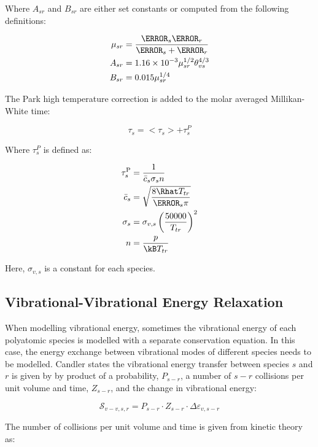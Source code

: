 \documentclass[10pt]{article}
\begin{document}
\begin{flushleft}
Where $A_{sr}$ and $B_{sr}$ are either set constants or computed from the following definitions:

\begin{align*}
    \mu_{sr} &= \frac{\MW_s \MW_r}{\MW_s + \MW_r}
    \\ A_{sr} &= 1.16 \times 10^{-3} \mu_{sr}^{1/2} \theta_{vs}^{4/3}
    \\ B_{sr} &= 0.015 \mu_{sr}^{1/4}
\end{align*}

The Park high temperature correction is added to the molar averaged Millikan-White time:

\begin{equation*}
    \tau_s = <\tau_s> + \tau_s^P
\end{equation*}

Where $\tau_s^P$ is defined as:

\begin{align*}
    \tau_{s}^\text{P} &= \frac{1}{\bar{c}_s \sigma_s n}
    \\ \bar{c}_s &= \sqrt{\frac{8 \Rhat T_{tr}}{ \MW_s \pi}}
    \\ \sigma_s &=  \sigma_{v,s} \bp{\frac{50000}{T_{tr}}}^2
    \\ n &= \frac{p}{\kB T_{tr}}
\end{align*}

Here, $\sigma_{v,s}$ is a constant for each species.

\subsection{Vibrational-Vibrational Energy Relaxation} 
\label{sec:vib-vib-relax}

When modelling vibrational energy, sometimes the vibrational energy of each polyatomic species is modelled with a separate conservation equation. In this case, the energy exchange between vibrational modes of different species needs to be modelled. Candler \cite{candlerthesis} states the vibrational energy transfer between species $s$ and $r$ is given by by product of a probability, $P_{s-r}$, a number of $s-r$ collisions per unit volume and time, $Z_{s-r}$, and the change in vibrational energy:

\begin{equation*}
    \mathcal{S}_{v-v,s,r} = P_{s-r} \cdot Z_{s-r} \cdot \Delta \varepsilon_{v,s-r}
\end{equation*}

The number of collisions per unit volume and time is given from kinetic theory as:


\end{flushleft}
\end{document}
